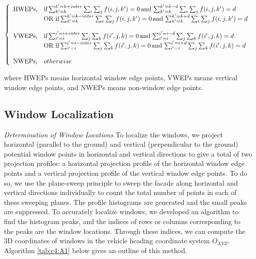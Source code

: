\begin{equation}
\left \{ 
\begin{array}{l l}
\text{HWEPs,} & \text{if} \sum_{k'=k}^{k'=k+inter} \sum_i \sum_j f(i,j,k')=0 \, \text{and} \, \sum_{k'=k}^{k'=k-d} \sum_i \sum_j f(i,j,k')=d\\
& \text{OR if} \sum_{k'=k}^{k'=k-inter} \sum_i \sum_j f(i,j,k')=0 \, \text{and} \, \sum_{k'=k}^{k'=k+d} \sum_i \sum_j f(i,j,k')=d\\
\\
\text{VWEPs,} & \text{if} \sum_{i'=i}^{i'=i+inter} \sum_j \sum_k f(i',j,k)=0 \, \text{and} \, \sum_{i'=i}^{i'=i-d} \sum_j \sum_k f(i',j,k)=d\\
& \text{OR if} \sum_{i'=i}^{i'=i-inter} \sum_j \sum_k f(i',j,k)=0 \, \text{and} \, \sum_{i'=i}^{i'=i+d} \sum_j \sum_k f(i',j,k)=d\\
\\
\text{NWEPs,} & otherwise
\end{array}\right.
\label{eq:C4:operator}
\end{equation} 

where HWEPs means horizontal window edge points, VWEPs means vertical window edge points, and NWEPs means non-window edge points.

\subsection{Window Localization}

{\it Determination of Window Locations} To localize the windows, we project horizontal (parallel to the ground) and vertical (perpendicular to the ground) potential window points in horizontal and vertical directions to give a total of two projection profiles: a horizontal projection profile of the horizontal window edge points and a vertical projection profile of the vertical window edge points. To do so, we use the plane-sweep principle to sweep the facade along horizontal and vertical directions individually to count the total number of points in each of these sweeping planes. The profile histograms are generated and the small peaks are suppressed. To accurately localize windows, we developed an algorithm to find the histogram peaks, and the indices of rows or columns corresponding to the peaks are the window locations. Through these indices, we can compute the 3D coordinates of windows in the vehicle heading coordinate system $O_{XYZ}$. Algorithm \ref {tab:c4:A1} below gives an outline of this method.

